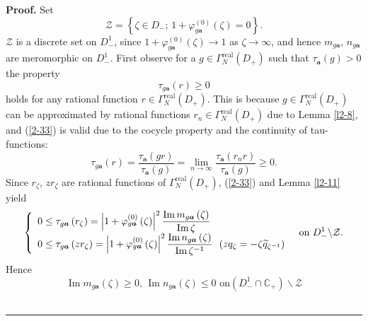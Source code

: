 \documentclass[a4paper]{article}%
\newenvironment{proof}[1][Proof]{\noindent\textbf{#1.} }{\ \rule{0.5em}{0.5em}}
\begin{document}
\begin{proof}
Set
\[
\mathcal{Z}=\left\{  \zeta\in D_{-}\text{; \ }1+\varphi_{g\boldsymbol{a}%
}^{\left(  0\right)  }\left(  \zeta\right)  =0\right\}  \text{.}%
\]
$\mathcal{Z}$ is a discrete set on $D_{-}^{1}$, since $1+\varphi
_{g\boldsymbol{a}}^{\left(  0\right)  }\left(  \zeta\right)  \rightarrow1$ as
$\zeta\rightarrow\infty$, and hence $m_{g\boldsymbol{a}}$, $n_{g\boldsymbol{a}%
}$ are meromorphic on $D_{-}^{1}$. First observe for a $g\in\Gamma
_{N}^{\operatorname{real}}\left(  D_{+}\right)  $ such that $\tau
_{\boldsymbol{a}}\left(  g\right)  >0$ the property%
\begin{equation}
\tau_{g\boldsymbol{a}}\left(  r\right)  \geq0 \label{2-33}%
\end{equation}
holds for any rational function $r\in\Gamma_{N}^{\operatorname{real}}\left(
D_{+}\right)  $. This is because $g\in\Gamma_{N}^{\operatorname{real}}\left(
D_{+}\right)  $ can be approximated by rational functions $r_{n}\in\Gamma
_{N}^{\operatorname{real}}\left(  D_{+}\right)  $ due to Lemma \ref{l2-8}, and
(\ref{2-33}) is valid due to the cocycle property and the continuity of
tau-functions:%
\[
\tau_{g\boldsymbol{a}}\left(  r\right)  =\dfrac{\tau_{\boldsymbol{a}}\left(
gr\right)  }{\tau_{\boldsymbol{a}}\left(  g\right)  }=\lim_{n\rightarrow
\infty}\dfrac{\tau_{\boldsymbol{a}}\left(  r_{n}r\right)  }{\tau
_{\boldsymbol{a}}\left(  g\right)  }\geq0\text{.}%
\]
Since $r_{\zeta}$, $zr_{\zeta}$ are rational functions of $\Gamma
_{N}^{\operatorname{real}}\left(  D_{+}\right)  $, (\ref{2-33}) and Lemma
\ref{l2-11} yield%
\[
\left\{
\begin{array}
[c]{l}%
0\leq\tau_{g\boldsymbol{a}}\left(  r_{\zeta}\right)  =\left\vert
1+\varphi_{g\boldsymbol{a}}^{\left(  0\right)  }\left(  \zeta\right)
\right\vert ^{2}\dfrac{\operatorname{Im}m_{g\boldsymbol{a}}\left(
\zeta\right)  }{\operatorname{Im}\zeta}\\
0\leq\tau_{g\boldsymbol{a}}\left(  zr_{\zeta}\right)  =\left\vert
1+\varphi_{g\boldsymbol{a}}^{\left(  0\right)  }\left(  \zeta\right)
\right\vert ^{2}\dfrac{\operatorname{Im}n_{g\boldsymbol{a}}\left(
\zeta\right)  }{\operatorname{Im}\zeta^{-1}}\text{ \ (}zq_{\zeta}%
=-\zeta\widetilde{q}_{\zeta^{-1}}\text{)}%
\end{array}
\right.  \text{ \ on }D_{-}^{1}\backslash\mathcal{Z}\text{.}%
\]
Hence
\[
\operatorname{Im}m_{g\boldsymbol{a}}\left(  \zeta\right)  \geq0\text{,
\ }\operatorname{Im}n_{g\boldsymbol{a}}\left(  \zeta\right)  \leq0\text{ \ on
}\left(  D_{-}^{1}\cap\mathbb{C}_{+}\right)  \backslash\mathcal{Z}%
\]
\end{proof}
\end{document}
